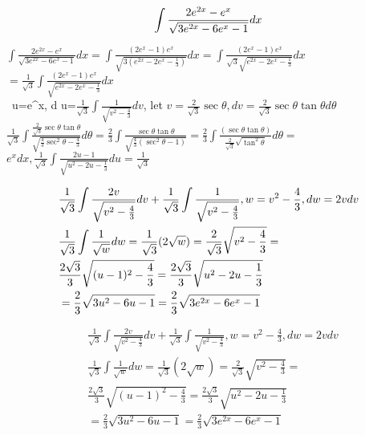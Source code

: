 \documentclass{article}
\begin{document}
$$
\int \frac{2 e^{2 x}-e^x}{\sqrt{3 e^{2 x}-6 e^x-1}} d x
\\$$

$\int \frac{2 e^{2 x}-e^x}{\sqrt{3 e^{2 x}-6 e^x-1}} d x=\int \frac{\left(2 e^x-1\right) e^x}{\sqrt{3\left(e^{2 x}-2 e^x-\frac{1}{3}\right)}} d x=\int \frac{\left(2 e^x-1\right) e^x}{\sqrt{3} \sqrt{e^{2 x}-2 e^x-\frac{1}{3}}} d x$
$=\frac{1}{\sqrt{3}} \int \frac{\left(2 e^x-1\right) e^x}{\sqrt{e^{2 x}-2 e^x-\frac{1}{3}}} d x$\\
\ u=e\^{}x, d u=$\frac{1}{\sqrt{3}} \int \frac{1}{\sqrt{v^2-\frac{4}{3}}} d v$, let $v=\frac{2}{\sqrt{3}} \sec \theta, d v=\frac{2}{\sqrt{3}} \sec \theta \tan \theta d \theta$\\
$\frac{1}{\sqrt{3}} \int \frac{\frac{2}{\sqrt{3}} \sec \theta \tan \theta}{\sqrt{\frac{4}{3} \sec ^2 \theta-\frac{4}{3}}} d \theta=\frac{2}{3} \int \frac{\sec \theta \tan \theta}{\sqrt{\frac{4}{3}\left(\sec ^2 \theta-1\right)}}=\frac{2}{3} \int \frac{(\sec \theta \tan \theta)}{\frac{2}{\sqrt{3}} \sqrt{\tan ^2 \theta}} d \theta=$
$e^x d x, \frac{1}{\sqrt{3}} \int \frac{2 u-1}{\sqrt{u^2-2 u-\frac{1}{3}}} d u=\frac{1}{\sqrt{3}}$

$$
\begin{aligned}
& \frac{1}{\sqrt{3}} \int \frac{2 v}{\sqrt{v^2-\frac{4}{3}}} d v+\frac{1}{\sqrt{3}} \int \frac{1}{\sqrt{v^2-\frac{4}{3}}}, w=v^2-\frac{4}{3}, d w=2 v d v \\
& \frac{1}{\sqrt{3}} \int \frac{1}{\sqrt{w}} d w=\frac{1}{\sqrt{3}}(2 \sqrt{w})=\frac{2}{\sqrt{3}} \sqrt{v^2-\frac{4}{3}}= \\
& \frac{2 \sqrt{3}}{3} \sqrt{(u-1)^2-\frac{4}{3}}=\frac{2 \sqrt{3}}{3} \sqrt{u^2-2 u-\frac{1}{3}} \\
& =\frac{2}{3} \sqrt{3 u^2-6 u-1}=\frac{2}{3} \sqrt{3 e^{2 x}-6 e^x-1}
\end{aligned}\\
$$


$$
\begin{aligned}
& \frac{1}{\sqrt{3}} \int \frac{2 v}{\sqrt{v^2-\frac{4}{3}}} d v+\frac{1}{\sqrt{3}} \int \frac{1}{\sqrt{v^2-\frac{4}{3}}}, w=v^2-\frac{4}{3}, d w=2 v d v \\
& \frac{1}{\sqrt{3}} \int \frac{1}{\sqrt{w}} d w=\frac{1}{\sqrt{3}}(2 \sqrt{w})=\frac{2}{\sqrt{3}} \sqrt{v^2-\frac{4}{3}}= \\
& \frac{2 \sqrt{3}}{3} \sqrt{(u-1)^2-\frac{4}{3}}=\frac{2 \sqrt{3}}{3} \sqrt{u^2-2 u-\frac{1}{3}} \\
& =\frac{2}{3} \sqrt{3 u^2-6 u-1}=\frac{2}{3} \sqrt{3 e^{2 x}-6 e^x-1}
\end{aligned}
$$
\end{document}
